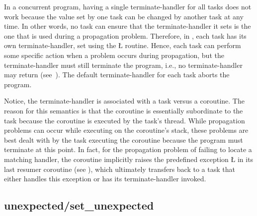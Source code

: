 \documentclass[openright,twoside]{report}
\begin{document}
In a concurrent program, having a single terminate-handler for all tasks does not work because the value set by one task can be changed by another task at any time.
In other words, no task can ensure that the terminate-handler it sets is the one that is used during a propagation problem.
Therefore, in \uC, each task has its own terminate-handler, set using the \LGinlinetrue\LGbegin\lgrinde\L{}\endlgrinde\LGend{} routine.
Hence, each task can perform some specific action when a problem occurs during propagation, but the terminate-handler must still terminate the program, i.e., no terminate-handler may return (see~).
The default terminate-handler for each task aborts the program.

Notice, the terminate-handler is associated with a task versus a coroutine.
The reason for this semantics is that the coroutine is essentially subordinate to the task because the coroutine is executed by the task's thread.
While propagation problems can occur while executing on the coroutine's stack, these problems are best dealt with by the task executing the coroutine because the program must terminate at this point.
In fact, for the propagation problem of failing to locate a matching handler, the coroutine implicitly raises the predefined exception \LGinlinetrue\LGbegin\lgrinde\L{}\endlgrinde\LGend{} in its last resumer coroutine (see ), which ultimately transfers back to a task that either handles this exception or has its terminate-handler invoked.


\subsection{{\texorpdfstring{{\BGfont unexpected}/{\BGfont set\_unexpected}}{unexpected/set\_unexpected}}}
\end{document}
